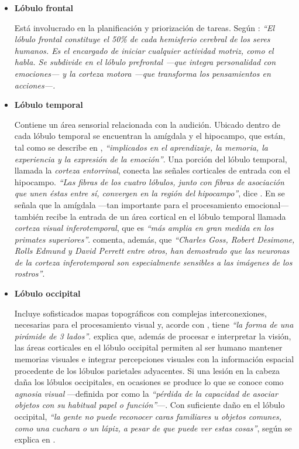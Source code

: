 \begin{itemize}
\item {\bf Lóbulo frontal}

  Está involucrado en la planificación y priorización de tareas. Según \cite{Restak1995}: {\it ``El lóbulo frontal constituye el 50\% de cada hemisferio cerebral de los seres humanos. Es el encargado de iniciar cualquier actividad motriz, como el habla. Se subdivide en el lóbulo prefrontal ---que integra personalidad con emociones--- y la corteza motora ---que transforma los pensamientos en acciones---.}

\item {\bf Lóbulo temporal}

Contiene un área sensorial relacionada con la audición. Ubicado dentro de cada lóbulo temporal se encuentran la amígdala y el hipocampo, que están, tal como se describe en \cite{Restak1995}, {\it ``implicados en el aprendizaje, la memoria, la experiencia y la expresión de la emoción''}. Una porción del lóbulo temporal, llamada la {\it corteza entorrinal}, conecta las señales corticales de entrada con el hipocampo. {\it ``Las fibras de los cuatro lóbulos, junto con fibras de asociación que unen éstas entre sí, convergen en la región del hipocampo''}, dice \cite{Restak1995}. En \cite{JohnAllman2000} se señala que la amígdala ---tan importante para el procesamiento emocional--- también recibe la entrada de un área cortical en el lóbulo temporal llamada {\it corteza visual inferotemporal}, que es {\it ``más amplia en gran medida en los primates superiores''}. \cite{JohnAllman2000} comenta, además, que {\it ``Charles Goss, Robert Desimone, Rolls Edmund y David Perrett entre otros, han demostrado que las neuronas de la corteza inferotemporal son especialmente sensibles a las imágenes de los rostros''}. 


\item {\bf Lóbulo occipital}

Incluye sofisticados mapas topográficos con complejas interconexiones, necesarias para el procesamiento visual y, acorde con \cite{Lindberg.}, tiene {\it ``la forma de una pirámide de 3 lados''}. \cite{MerckCo.} explica que, además de procesar e interpretar la visión, las áreas corticales en el lóbulo occipital permiten al ser humano mantener memorias visuales e integrar percepciones visuales con la información espacial procedente de los lóbulos parietales adyacentes. Si una lesión en la cabeza daña los lóbulos occipitales, en ocasiones se produce lo que se conoce como {\it agnosia visual} ---definida por \cite{MerckCo.} como la {\it ``pérdida de la capacidad de asociar objetos con su habitual papel o función''}---. Con suficiente daño en el lóbulo occipital, {\it ``la gente no puede reconocer caras familiares u objetos comunes, como una cuchara o un lápiz, a pesar de que puede ver estas cosas''}, según se explica en \cite{MerckCo.}.


\end{itemize}
